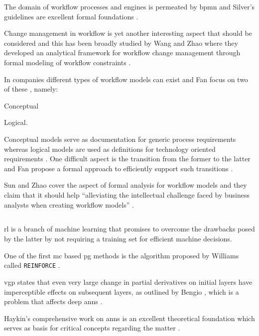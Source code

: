 \documentclass{seal_thesis}
\begin{document}
The domain of workflow processes and engines is permeated by \gls{bpmn} and Silver's guidelines are excellent formal foundations \cite{Silver2011}.

Change management in workflow is yet another interesting aspect that should be considered and this has been broadly studied by Wang and Zhao where they developed an analytical framework for workflow change management through formal modeling of workflow constraints \cite{Wang2011}.

In companies different types of workflow models can exist and Fan \etal focus on two of these \cite{Fan2012}, namely:
\begin{enumerate*}
	\item Conceptual
	\item Logical.
\end{enumerate*}

Conceptual models serve as documentation for generic process requirements whereas logical models are used as definitions for technology oriented requirements \cite{Fan2012}. One difficult aspect is the transition from the former to the latter and Fan \etal propose a formal approach to efficiently support such transitions \cite{Fan2012}.

Sun and Zhao cover the aspect of formal analysis for workflow models and they claim that it should help ``alleviating the intellectual challenge faced by business analysts when creating workflow models'' \cite{Sun2013}.

\subsection{}

\gls{rl} is a branch of machine learning that promises to overcome the drawbacks posed by the latter by not requiring a training set for efficient machine decisions. 

One of the first \gls{mc} based \gls{pg} methods is the algorithm proposed by Williams called \texttt{REINFORCE} \cite{Williams1992}.

\gls{vgp} states that even very large change in partial derivatives on initial layers have imperceptible effects on subsequent layers, as outlined by Bengio \etal, which is a problem that affects deep \glspl{ann} \cite{Bengio1994}.

Haykin's comprehensive work on \glspl{ann} is an excellent theoretical foundation which serves as basis for critical concepts regarding the matter \cite{Haykin1998}.
\end{document}
